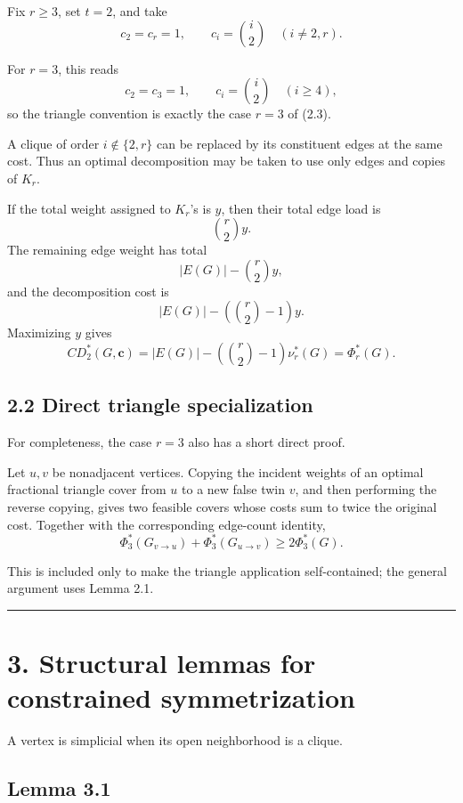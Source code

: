 \documentclass[11pt,a4paper]{article}
\begin{document}
Fix \(r\ge3\), set \(t=2\), and take
\[
c_2=c_r=1,
\qquad
c_i=\binom i2
\quad(i\ne2,r).
\tag{2.3}
\]

For \(r=3\), this reads
\[
c_2=c_3=1,
\qquad
c_i=\binom i2\quad(i\ge4),
\]
so the triangle convention is exactly the case \(r=3\) of (2.3).

A clique of order \(i\notin\{2,r\}\) can be replaced by its constituent
edges at the same cost. Thus an optimal decomposition may be taken to use
only edges and copies of \(K_r\).

If the total weight assigned to \(K_r\)'s is \(y\), then their total edge
load is
\[
\binom r2y.
\]
The remaining edge weight has total
\[
|E(G)|-\binom r2y,
\]
and the decomposition cost is
\[
|E(G)|
-
\left(\binom r2-1\right)y.
\]
Maximizing \(y\) gives
\[
CD_2^*(G,\mathbf c)
=
|E(G)|
-
\left(\binom r2-1\right)\nu_r^*(G)
=
\Phi_r^*(G).
\tag{2.4}
\]

\subsection{2.2 Direct triangle specialization}\label{direct-triangle-specialization}

For completeness, the case \(r=3\) also has a short direct proof.

Let \(u,v\) be nonadjacent vertices. Copying the incident weights of an
optimal fractional triangle cover from \(u\) to a new false twin \(v\), and
then performing the reverse copying, gives two feasible covers whose costs
sum to twice the original cost. Together with the corresponding edge-count
identity,
\[
\Phi_3^*(G_{v\to u})
+
\Phi_3^*(G_{u\to v})
\ge
2\Phi_3^*(G).
\tag{2.5}
\]

This is included only to make the triangle application self-contained; the
general argument uses Lemma 2.1.

\begin{center}\rule{0.5\linewidth}{0.5pt}\end{center}

\section{3. Structural lemmas for constrained symmetrization}\label{structural-lemmas-for-constrained-symmetrization}

A vertex is simplicial when its open neighborhood is a clique.

\subsection{Lemma 3.1}\label{lemma-3.1}
\end{document}
